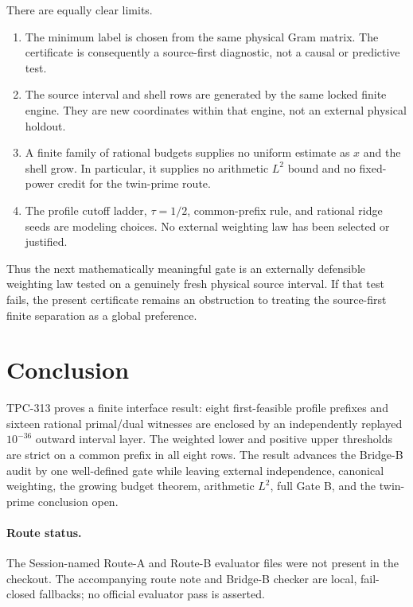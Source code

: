 \documentclass[10pt,a4paper]{article}
\begin{document}
There are equally clear limits.

\begin{enumerate}[leftmargin=1.6em]
\item The minimum label is chosen from the same physical Gram matrix.  The
      certificate is consequently a source-first diagnostic, not a causal or
      predictive test.
\item The source interval and shell rows are generated by the same locked
      finite engine.  They are new coordinates within that engine, not an
      external physical holdout.
\item A finite family of rational budgets supplies no uniform estimate as
      $x$ and the shell grow.  In particular, it supplies no arithmetic
      $L^2$ bound and no fixed-power credit for the twin-prime route.
\item The profile cutoff ladder, $\tau=1/2$, common-prefix rule, and rational
      ridge seeds are modeling choices.  No external weighting law has been
      selected or justified.
\end{enumerate}

Thus the next mathematically meaningful gate is an externally defensible
weighting law tested on a genuinely fresh physical source interval.  If that
test fails, the present certificate remains an obstruction to treating the
source-first finite separation as a global preference.

\section{Conclusion}

TPC-313 proves a finite interface result: eight first-feasible profile
prefixes and sixteen rational primal/dual witnesses are enclosed by an
independently replayed $10^{-36}$ outward interval layer.  The weighted lower
and positive upper thresholds are strict on a common prefix in all eight
rows.  The result advances the Bridge-B audit by one well-defined gate while
leaving external independence, canonical weighting, the growing budget
theorem, arithmetic $L^2$, full Gate B, and the twin-prime conclusion open.

\paragraph{Route status.}
The Session-named Route-A and Route-B evaluator files were not present in the
checkout.  The accompanying route note and Bridge-B checker are local,
fail-closed fallbacks; no official evaluator pass is asserted.


\begingroup\small

\endgroup
\end{document}
